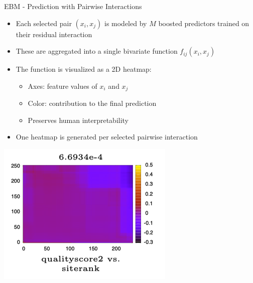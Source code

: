 \documentclass[10pt,compress,t,notes=noshow, xcolor=table]{beamer}
\begin{document}



\begin{frame}{EBM - Prediction with Pairwise Interactions}
\begin{itemize}
    \item Each selected pair $(x_i, x_j)$ is modeled by $M$ boosted predictors trained on their residual interaction
    \item These are aggregated into a single bivariate function $f_{ij}(x_i, x_j)$
    \item The function is visualized as a 2D heatmap: 
    \begin{itemize}
        \item Axes: feature values of $x_i$ and $x_j$
        \item Color: contribution to the final prediction
        \item Preserves human interpretability 
    \end{itemize}
    \item One heatmap is generated per selected pairwise interaction
\end{itemize}

\vspace{0.3cm}
\centering
\includegraphics[width=0.42\linewidth]{figure/3D Heatmap.png}
\end{frame}
\end{document}
